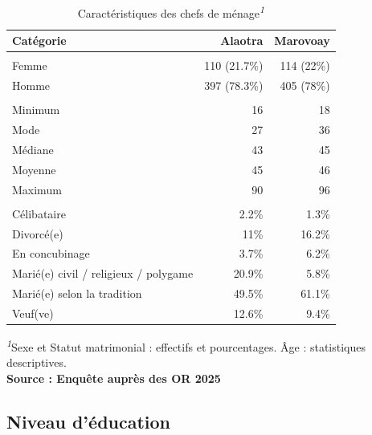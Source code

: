 \documentclass[
  french,
  letterpaper,
]{report}
\begin{document}
\begin{table}
\caption*{
{\fontsize{20}{25}\selectfont  Caractéristiques des chefs de ménage\textsuperscript{\textit{1}}\fontsize{12}{15}\selectfont }
} 
\fontsize{12.0pt}{14.0pt}\selectfont
\begin{tabular*}{\linewidth}{@{\extracolsep{\fill}}lrr}
\toprule
Catégorie & {\bfseries {Alaotra}} & {\bfseries {Marovoay}} \\ 
\midrule\addlinespace[2.5pt]
\multicolumn{3}{l}{{\bfseries {Sexe}}} \\[2.5pt] 
\midrule\addlinespace[2.5pt]
Femme & 110 (21.7\%) & 114 (22\%) \\ 
Homme & 397 (78.3\%) & 405 (78\%) \\ 
\midrule\addlinespace[2.5pt]
\multicolumn{3}{l}{{\bfseries {Âge}}} \\[2.5pt] 
\midrule\addlinespace[2.5pt]
Minimum & 16 & 18 \\ 
Mode & 27 & 36 \\ 
Médiane & 43 & 45 \\ 
Moyenne & 45 & 46 \\ 
Maximum & 90 & 96 \\ 
\midrule\addlinespace[2.5pt]
\multicolumn{3}{l}{{\bfseries {Statut matrimonial}}} \\[2.5pt] 
\midrule\addlinespace[2.5pt]
Célibataire & 2.2\% & 1.3\% \\ 
Divorcé(e) & 11\% & 16.2\% \\ 
En concubinage & 3.7\% & 6.2\% \\ 
Marié(e) civil / religieux / polygame & 20.9\% & 5.8\% \\ 
Marié(e) selon la tradition & 49.5\% & 61.1\% \\ 
Veuf(ve) & 12.6\% & 9.4\% \\ 
\bottomrule
\end{tabular*}
\begin{minipage}{\linewidth}
\textsuperscript{\textit{1}}Sexe et Statut matrimonial : effectifs et pourcentages. Âge : statistiques descriptives.\\
\textbf{Source : Enquête auprès des OR 2025}\\
\end{minipage}
\end{table}

\subsection{Niveau d'éducation}\label{niveau-duxe9ducation}
\end{document}
